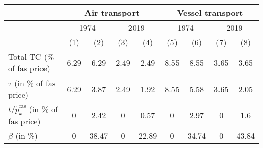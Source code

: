 \begin{tabular}{l|cc|cc||cc|cc}
\hline \hline
& \multicolumn{4}{|c||}{Air transport} & \multicolumn{4}{|c}{Vessel transport} \\ \hline
& \multicolumn{2}{|c|}{1974} & \multicolumn{2}{|c||}{2019} & \multicolumn{2}{|c|}{1974} & \multicolumn{2}{|c}{2019}\\ \cline{2-9}
& (1) & (2) &  (3) & (4) & (5) & (6) &  (7) & (8)\\ \hline
Total TC (\% of fas price) & 6.29 & 6.29 & 2.49 & 2.49 & 8.55 & 8.55 & 3.65 & 3.65 \\
$\tau$ (in \% of fas price) & 6.29 & 3.87 & 2.49 & 1.92 & 8.55 & 5.58 & 3.65 & 2.05\\
$t/\widetilde{p}^{\text{fas}}_x$ (in \% of fas price) & 0 & 2.42 & 0 & 0.57 & 0 & 2.97 & 0 & 1.6\\ \hline
$\beta$ (in \%) & 0 & 38.47 & 0 & 22.89 & 0 & 34.74 & 0 & 43.84 \\
\hline \hline
\end{tabular} 